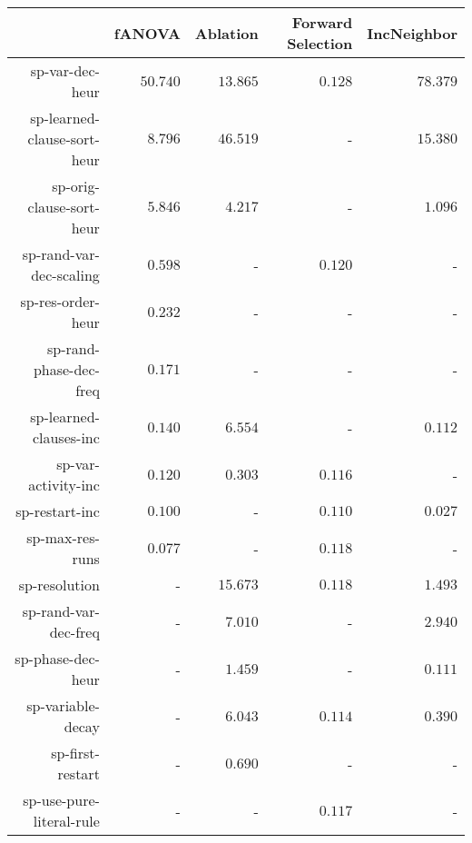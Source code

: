 \begin{table}
\begin{tabular}{r|r|r|r|r}
\toprule
                            &      fANOVA       &     Ablation      & Forward Selection &    IncNeighbor   \\
\hline
sp-var-dec-heur             & $         50.740$ & $         13.865$ & $          0.128$ & $         78.379$\\
sp-learned-clause-sort-heur & $          8.796$ & $         46.519$ &                 - & $         15.380$\\
sp-orig-clause-sort-heur    & $          5.846$ & $          4.217$ &                 - & $          1.096$\\
sp-rand-var-dec-scaling     & $          0.598$ &                 - & $          0.120$ &                 -\\
sp-res-order-heur           & $          0.232$ &                 - &                 - &                 -\\
sp-rand-phase-dec-freq      & $          0.171$ &                 - &                 - &                 -\\
sp-learned-clauses-inc      & $          0.140$ & $          6.554$ &                 - & $          0.112$\\
sp-var-activity-inc         & $          0.120$ & $          0.303$ & $          0.116$ &                 -\\
sp-restart-inc              & $          0.100$ &                 - & $          0.110$ & $          0.027$\\
sp-max-res-runs             & $          0.077$ &                 - & $          0.118$ &                 -\\
sp-resolution               &                 - & $         15.673$ & $          0.118$ & $          1.493$\\
sp-rand-var-dec-freq        &                 - & $          7.010$ &                 - & $          2.940$\\
sp-phase-dec-heur           &                 - & $          1.459$ &                 - & $          0.111$\\
sp-variable-decay           &                 - & $          6.043$ & $          0.114$ & $          0.390$\\
sp-first-restart            &                 - & $          0.690$ &                 - &                 -\\
sp-use-pure-literal-rule    &                 - &                 - & $          0.117$ &                 -\\

\end{tabular}
\end{table}
